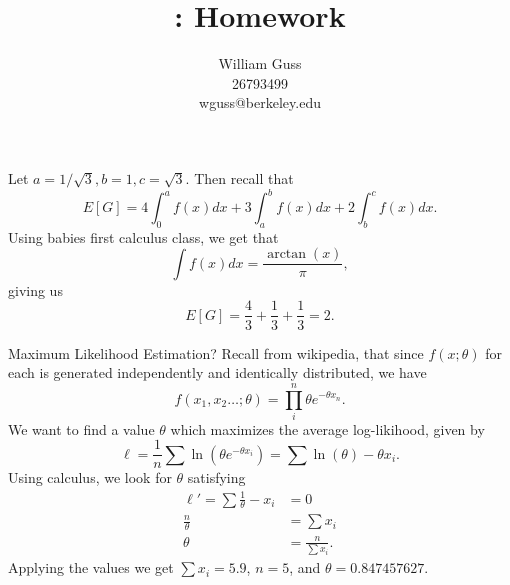\documentclass[letter]{article}
\title{\bCLASS: Homework \bHWN}
\author{William Guss\\26793499\\wguss@berkeley.edu}
\newenvironment{menumerate}{%
  \edef\backupindent{\the\parindent}%
  \enumerate%
  \setlength{\parindent}{\backupindent}%
}{\endenumerate}
\begin{document}
\maketitle
\thispagestyle{empty}

\begin{menumerate}
\item Let $a = 1/\sqrt{3}, b = 1, c = \sqrt{3}.$ Then recall that 
\begin{equation}
  E[G] = 4\int_0^a f(x) dx + 3 \int_a^b f(x) dx + 2\int_b^c f(x) dx.
\end{equation}
Using babies first calculus class, we get that 
\begin{equation}
\int f(x) dx = \frac{\arctan(x)}{\pi},
\end{equation}
giving us  
\begin{equation}
E[G] = \frac{4}{3} + \frac{1}{3} + \frac{1}{3} = 2.
\end{equation}
\newpage
\item Maximum Likelihood Estimation?
Recall from wikipedia, that since $f(x;\theta)$ for each is generated independently
and identically distributed, we have
\begin{equation}
f(x_1,x_2\dots;\theta) = \prod_i^n \theta e^{-\theta x_n}.
\end{equation}
We want to find a value $\theta$ which maximizes the average log-likihood, given by
\begin{equation}
  \ell = \frac{1}{n} \sum \ln (\theta e^{-\theta x_i}) = \sum \ln (\theta) -\theta x_i.
\end{equation}
Using calculus, we look for $\theta$ satisfying
\begin{equation}
  \begin{aligned}
    \ell' = \sum \frac{1}{\theta} - x_i &= 0 \\
    \frac{n}{\theta}  &= \sum x_i\\
    \theta &= \frac{n}{\sum x_i}.
  \end{aligned}
\end{equation}
Applying the values we get $\sum x_i = 5.9$, $n = 5$, and $\theta = 0.847457627.$


\end{menumerate}
\end{document}
